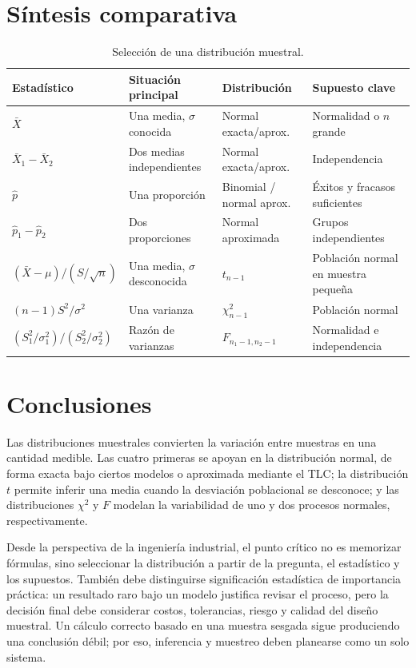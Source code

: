 \section{Síntesis comparativa}
\begin{table}[H]
\centering
\small
\caption{Selección de una distribución muestral.}
\begin{tabularx}{\textwidth}{@{}lXll@{}}
\toprule
\textbf{Estadístico} & \textbf{Situación principal} & \textbf{Distribución} & \textbf{Supuesto clave}\\
\midrule
$\bar X$ & Una media, $\sigma$ conocida & Normal exacta/aprox. & Normalidad o $n$ grande\\
$\bar X_1-\bar X_2$ & Dos medias independientes & Normal exacta/aprox. & Independencia\\
$\hat p$ & Una proporción & Binomial / normal aprox. & Éxitos y fracasos suficientes\\
$\hat p_1-\hat p_2$ & Dos proporciones & Normal aproximada & Grupos independientes\\
$(\bar X-\mu)/(S/\sqrt n)$ & Una media, $\sigma$ desconocida & $t_{n-1}$ & Población normal en muestra pequeña\\
$(n-1)S^2/\sigma^2$ & Una varianza & $\chi^2_{n-1}$ & Población normal\\
$(S_1^2/\sigma_1^2)/(S_2^2/\sigma_2^2)$ & Razón de varianzas & $F_{n_1-1,n_2-1}$ & Normalidad e independencia\\
\bottomrule
\end{tabularx}
\end{table}

\section{Conclusiones}
Las distribuciones muestrales convierten la variación entre muestras en una cantidad medible. Las cuatro primeras se apoyan en la distribución normal, de forma exacta bajo ciertos modelos o aproximada mediante el TLC; la distribución $t$ permite inferir una media cuando la desviación poblacional se desconoce; y las distribuciones $\chi^2$ y $F$ modelan la variabilidad de uno y dos procesos normales, respectivamente.

Desde la perspectiva de la ingeniería industrial, el punto crítico no es memorizar fórmulas, sino seleccionar la distribución a partir de la pregunta, el estadístico y los supuestos. También debe distinguirse significación estadística de importancia práctica: un resultado raro bajo un modelo justifica revisar el proceso, pero la decisión final debe considerar costos, tolerancias, riesgo y calidad del diseño muestral. Un cálculo correcto basado en una muestra sesgada sigue produciendo una conclusión débil; por eso, inferencia y muestreo deben planearse como un solo sistema.

\clearpage

